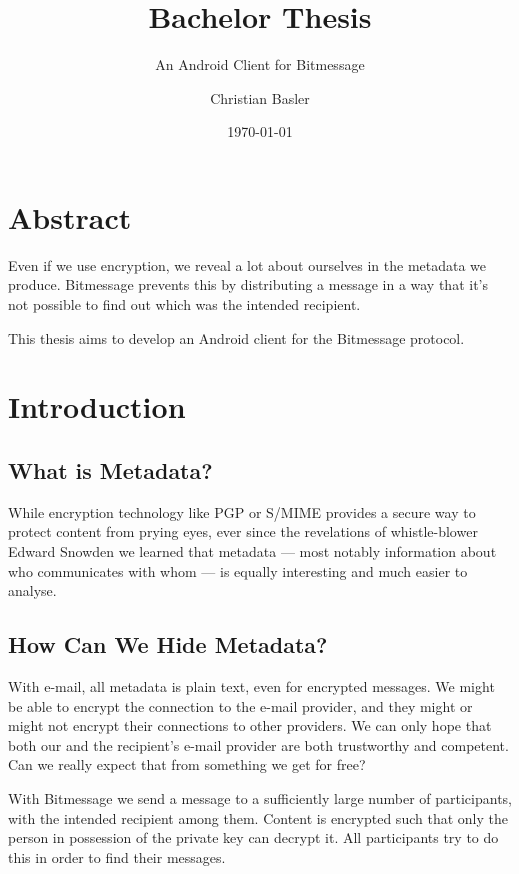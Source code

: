 \documentclass{bfh}
\title{Bachelor Thesis}
\subtitle{An Android Client for Bitmessage}
\author{Christian Basler}
\date{\today}
\begin{document}
  \maketitle

  \tableofcontents

  \listoffigures

  \newpage
  \section*{Abstract}

  Even if we use encryption, we reveal a lot about ourselves in the metadata we produce. Bitmessage prevents this by distributing a message in a way that it's not possible to find out which was the intended recipient.
  
  This thesis aims to develop an Android client for the Bitmessage protocol.

  \newpage

  \section{Introduction}

  \subsection{What is Metadata?}

  While encryption technology like PGP or S/MIME provides a secure way to protect content from prying eyes, ever since the revelations of whistle-blower Edward Snowden we learned that metadata --- most notably information about who communicates with whom --- is equally interesting and much easier to analyse.\cite{guardian:metadata}

  \subsection{How Can We Hide Metadata?}

  With e-mail, all metadata is plain text, even for encrypted messages. We might be able to encrypt the connection to the e-mail provider, and they might or might not encrypt their connections to other providers. We can only hope that both our and the recipient's e-mail provider are both trustworthy and competent. Can we really expect that from something we get for free?

  With Bitmessage we send a message to a sufficiently large number of participants, with the intended recipient among them. Content is encrypted such that only the person in possession of the private key can decrypt it. All participants try to do this in order to find their messages.
\end{document}
